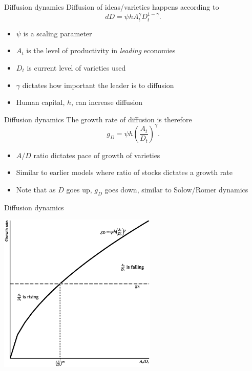 \begin{frame}{Diffusion dynamics}
Diffusion of ideas/varieties happens according to
\begin{equation}
	dD = \psi h A_t^{\gamma} D_t^{1-\gamma}. \label{EQ_dotD}
\end{equation}
\begin{itemize}
	\item $\psi$ is a scaling parameter
	\item $A_t$ is the level of productivity in \textit{leading} economies
	\item $D_t$ is current level of varieties used
	\item $\gamma$ dictates how important the leader is to diffusion
	\item Human capital, $h$, can increase diffusion
\end{itemize}
\end{frame}

\begin{frame}{Diffusion dynamics}
The growth rate of diffusion is therefore
\begin{equation}
	g_D = \psi h \left(\frac{A_t}{D_t}\right)^{\gamma}. \label{EQ_gD}
\end{equation}
\begin{itemize}
	\item $A/D$ ratio dictates pace of growth of varieties
	\item Similar to earlier models where ratio of stocks dictates a growth rate
	\item Note that as $D$ goes up, $g_D$ goes down, similar to Solow/Romer dynamics
\end{itemize}
\end{frame}

\begin{frame}{Diffusion dynamics}
\begin{center}
\includegraphics[height=3in]{../Figures/fig-ch7-fig2.eps}
\end{center}
\end{frame}


